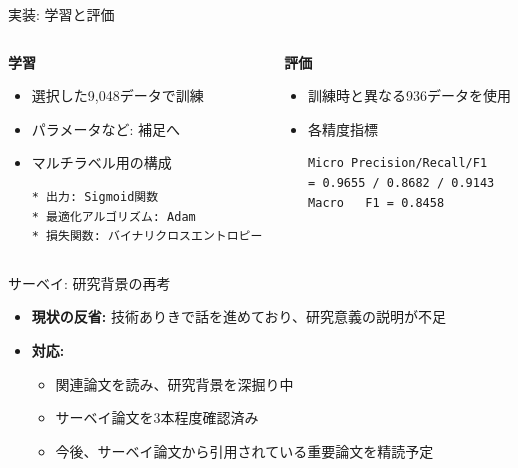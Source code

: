 \documentclass[unicode,12pt,aspectratio=169,dvipdfmx]{beamer}
\begin{document}
\begin{frame}[fragile]{実装: 学習と評価}
    \begin{columns}[T]
        \begin{column}{0.5\textwidth}
            \textbf{学習}
            \begin{itemize}
                \item 選択した9,048データで訓練
                \item パラメータなど: 補足へ
                \item マルチラベル用の構成
\begin{verbatim}
* 出力: Sigmoid関数
* 最適化アルゴリズム: Adam
* 損失関数: バイナリクロスエントロピー
\end{verbatim}
            \end{itemize}
        \end{column}
        \begin{column}{0.5\textwidth}
            \textbf{評価}
            \begin{itemize}
                \item 訓練時と異なる936データを使用
                \item 各精度指標
\begin{verbatim}
Micro Precision/Recall/F1 
= 0.9655 / 0.8682 / 0.9143
Macro   F1 = 0.8458
\end{verbatim}
            \end{itemize}
        \end{column}
    \end{columns}
\end{frame}

\begin{frame}{サーベイ: 研究背景の再考}
  \begin{itemize}
    \item \textbf{現状の反省:} 技術ありきで話を進めており、研究意義の説明が不足
    \item \textbf{対応:}
    \begin{itemize}
        \item 関連論文を読み、研究背景を深掘り中
        \item サーベイ論文を3本程度確認済み
        \item 今後、サーベイ論文から引用されている重要論文を精読予定
    \end{itemize}
  \end{itemize}
\end{frame}
\end{document}
